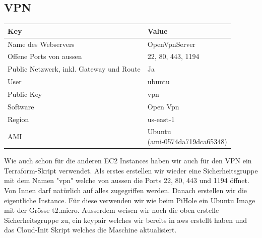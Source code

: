 \documentclass{article}
\begin{document}
\clearpage

\subsection{VPN}

\begin{center}

\begin{tabular}{|l|l|}
\hline
\textbf{Key} & \textbf{Value} \\ \hline
Name des Webservers & OpenVpnServer \\ \hline
Offene Ports von aussen & 22, 80, 443, 1194 \\ \hline
Public Netzwerk, inkl. Gateway und Route & Ja \\ \hline
User & ubuntu \\ \hline
Public Key & vpn \\ \hline
Software & Open Vpn \\ \hline
Region & us-east-1 \\ \hline
AMI & \makecell{Ubuntu  \\ (ami-0574da719dca65348)} \\ \hline
\end{tabular}

\end{center}

\vspace{10pt}

\noindent Wie auch schon für die anderen EC2 Instances haben wir auch für den VPN ein Terraform-Skript verwendet. Als erstes erstellen wir wieder eine Sicherheitsgruppe mit dem Namen "vpn" welche von aussen die Ports 22, 80, 443 und 1194 öffnet. Von Innen darf natürlich auf alles zugegriffen werden. Danach erstellen wir die eigentliche Instance. Für diese verwenden wir wie beim PiHole ein Ubuntu Image mit der Grösse t2.micro. Ausserdem weisen wir noch die oben erstelle Sicherheitsgruppe zu, ein keypair welches wir bereits in aws erstellt haben und das Cloud-Init Skript welches die Maschine aktualisiert.

\vspace{30pt}
\end{document}

